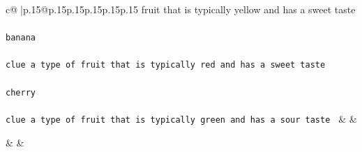 \documentclass{article}
\begin{document}
{\begin{supertabular}{c@{$\;$}|p{.15\linewidth}@{}p{.15\linewidth}p{.15\linewidth}p{.15\linewidth}p{.15\linewidth}p{.15\linewidth}}
{{{fruit that is typically yellow and has a sweet taste\\ \tt \\ \tt  banana\\ \tt \\ \tt clue a type of fruit that is typically red and has a sweet taste\\ \tt \\ \tt  cherry\\ \tt \\ \tt clue a type of fruit that is typically green and has a sour taste 
	  } 
	   } 
	   } 
	 & & \\ 
 

    \theutterance {}  

    & & 
\end{supertabular}}
\end{document}
